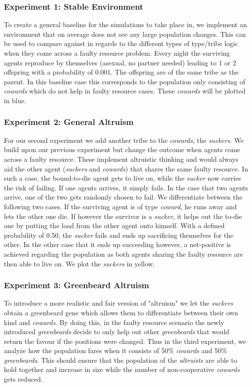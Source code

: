 \documentclass[sigconf]{acmart}
\newcommand{\todo}[1]{{\color{red}{#1}}}
\newcommand{\VProbAltruistDies}{0.50\xspace}
\newcommand{\VProbKids}{0.001\xspace}
\newcommand{\cowards}{\textit{cowards}\xspace}
\newcommand{\coward}{\textit{coward}\xspace}
\newcommand{\altruists}{\textit{altruists}\xspace}
\newcommand{\suckers}{\textit{suckers}\xspace}
\newcommand{\sucker}{\textit{sucker}\xspace}
\newcommand{\greenbeards}{\textit{greenbeards}\xspace}
\begin{document}
    \subsubsection*{Experiment 1: Stable Environment}
    To create a general baseline for the simulations to take place in, we implement an environment that on average does not see any large population changes.
    This can be used to compare against in regards to the different types of type/tribe logic when they come across a faulty resource problem.
    Every night the surviving agents reproduce by themselves (asexual, no partner needed) leading to 1 or 2 offspring with a probability of \VProbKids.
    The offspring are of the same tribe as the parent.
    In this baseline case this corresponds to the population only consisting of \cowards which do not help in faulty resource cases.
    These \cowards will be plotted in blue.

    \subsubsection*{Experiment 2: General Altruism}
    For our second experiment we add another tribe to the \cowards, the \suckers.
    We build upon our previous experiment but change the outcome when agents come across a faulty resource.
    These implement altruistic thinking and would always aid the other agent (\suckers and \cowards) that shares the same faulty resource.
    In such a case, the bound-to-die agent gets to live on, while the \sucker now carries the risk of failing.
    If one agents arrives, it simply fails.
    In the case that two agents arrive, one of the two gets randomly chosen to fail.
    We differentiate between the following two cases.
    If the surviving agent is of type \coward, he runs away and lets the other one die.
    If however the survivor is a \sucker, it helps out the to-die one by putting the load from the other agent onto himself.
    With a defined probability of \VProbAltruistDies, the \sucker fails and ends up sacrificing themselves for the other.
    In the other case that it ends up succeeding however, a net-positive is achieved regarding the population as both agents sharing the faulty resource are then able to live on.
    We plot the \suckers in yellow.


    \todo{add code with logic}

    \subsubsection*{Experiment 3: Greenbeard Altruism}
    To introduce a more realistic and fair version of "altruism" we let the \suckers obtain a greenbeard gene which allows them to differentiate between their own kind and \cowards.
    By doing this, in the faulty resource scenario the newly introduced \greenbeards decide to only help out other \greenbeards that would return the favour if the positions were changed.
    Thus in the third experiment, we analyze how the population fares when it consists of 50\% \cowards and 50\% \greenbeards.
    This should ensure that the population of the \altruists are able to hold together and increase in size while the number of non-cooperative \cowards gets reduced.
\end{document}
